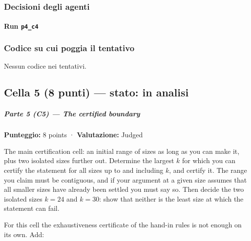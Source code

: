 \documentclass[11pt,a4paper]{article}
\begin{document}
\subsubsection{Decisioni degli agenti}
\paragraph{Run \texttt{p4\_c4}}

\subsubsection{Codice su cui poggia il tentativo}
Nessun codice nei tentativi.

\subsection{Cella 5 (8 punti) — stato: in analisi}
\subparagraph{Parte 5 (C5) --- The certified
boundary}\label{parte-5-c5-the-certified-boundary}

\textbf{Punteggio:} 8 points · \textbf{Valutazione:} Judged

The main certification cell: an initial range of sizes as long as you
can make it, plus two isolated sizes further out. Determine the largest
\(k\) for which you can certify the statement for all sizes up to and
including \(k\), and certify it. The range you claim must be contiguous,
and if your argument at a given size assumes that all smaller sizes have
already been settled you must say so. Then decide the two isolated sizes
\(k = 24\) and \(k = 30\): show that neither is the least size at which
the statement can fail.

For this cell the exhaustiveness certificate of the hand-in rules is not
enough on its own. Add:
\end{document}
